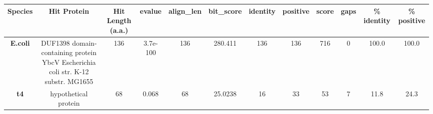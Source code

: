 \begin{tabular}{|c|c|c|c|c|c|c|c|c|c|c|c|} \hline
\textbf{Species} & \textbf{Hit Protein} & \textbf{Hit Length (a.a.)} & \textbf{evalue} & \textbf{align\_len} & \textbf{bit\_score} & \textbf{identity} & \textbf{positive} & \textbf{score} & \textbf{gaps} & \textbf{\% identity} & \textbf{\% positive} \\ \hline
\textbf{E.coli} & DUF1398 domain-containing protein YbcV Escherichia coli str. K-12 substr. MG1655 & 136 & 3.7e-100 & 136 & 280.411 & 136 & 136 & 716 & 0 & 100.0 & 100.0\\
\textbf{t4} & hypothetical protein  & 68 & 0.068 & 68 & 25.0238 & 16 & 33 & 53 & 7 & 11.8 & 24.3\\
\hline \end{tabular}
